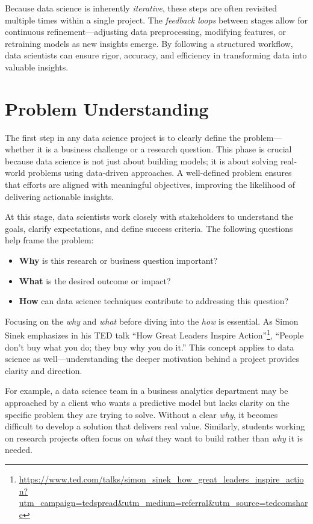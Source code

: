 \documentclass[
  11pt,
]{book}
\providecommand{\tightlist}{%
  \setlength{\itemsep}{0pt}\setlength{\parskip}{0pt}}
\renewcommand{\href}[2]{#2\footnote{\url{#1}}}
\theoremstyle{definition}
\theoremstyle{definition}
\theoremstyle{definition}
\theoremstyle{definition}
\theoremstyle{remark}
\begin{document}
Because data science is inherently \emph{iterative}, these steps are often revisited multiple times within a single project. The \emph{feedback loops} between stages allow for continuous refinement---adjusting data preprocessing, modifying features, or retraining models as new insights emerge. By following a structured workflow, data scientists can ensure rigor, accuracy, and efficiency in transforming data into valuable insights.

\section{Problem Understanding}\label{problem-understanding}

The first step in any data science project is to clearly define the problem---whether it is a business challenge or a research question. This phase is crucial because data science is not just about building models; it is about solving real-world problems using data-driven approaches. A well-defined problem ensures that efforts are aligned with meaningful objectives, improving the likelihood of delivering actionable insights.

At this stage, data scientists work closely with stakeholders to understand the goals, clarify expectations, and define success criteria. The following questions help frame the problem:

\begin{itemize}
\tightlist
\item
  \textbf{Why} is this research or business question important?\\
\item
  \textbf{What} is the desired outcome or impact?\\
\item
  \textbf{How} can data science techniques contribute to addressing this question?
\end{itemize}

Focusing on the \emph{why} and \emph{what} before diving into the \emph{how} is essential. As Simon Sinek emphasizes in his TED talk \href{https://www.ted.com/talks/simon_sinek_how_great_leaders_inspire_action?utm_campaign=tedspread&utm_medium=referral&utm_source=tedcomshare}{``How Great Leaders Inspire Action''}, ``People don't buy what you do; they buy why you do it.'' This concept applies to data science as well---understanding the deeper motivation behind a project provides clarity and direction.

For example, a data science team in a business analytics department may be approached by a client who wants a predictive model but lacks clarity on the specific problem they are trying to solve. Without a clear \emph{why}, it becomes difficult to develop a solution that delivers real value. Similarly, students working on research projects often focus on \emph{what} they want to build rather than \emph{why} it is needed.
\end{document}
